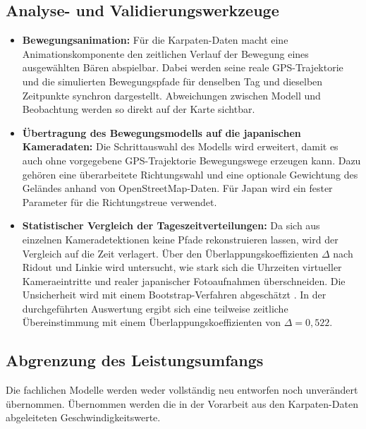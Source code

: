 \documentclass[12pt,a4paper]{report}
\begin{document}
\subsection*{Analyse- und Validierungswerkzeuge}

\begin{itemize}
    
    
    \item \textbf{Bewegungsanimation:}
    Für die Karpaten-Daten macht eine Animationskomponente
    den zeitlichen Verlauf der Bewegung eines ausgewählten
    Bären abspielbar. Dabei werden seine reale
    GPS-Trajektorie und die simulierten Bewegungspfade
    für denselben Tag und dieselben Zeitpunkte synchron
    dargestellt. Abweichungen zwischen Modell und
    Beobachtung werden so direkt auf der Karte sichtbar.
    

    \item \textbf{Übertragung des Bewegungsmodells
    auf die japanischen Kameradaten:}
    Die Schrittauswahl des Modells wird erweitert,
    damit es auch ohne vorgegebene GPS-Trajektorie
    Bewegungswege erzeugen kann. Dazu gehören eine
    überarbeitete Richtungswahl und eine optionale
    Gewichtung des Geländes anhand von OpenStreetMap-Daten.
    Für Japan wird ein fester Parameter für die
    Richtungstreue verwendet.
    
   
    \item \textbf{Statistischer Vergleich der
    Tageszeitverteilungen:}
    Da sich aus einzelnen Kameradetektionen keine
    Pfade rekonstruieren lassen, wird der Vergleich
    auf die Zeit verlagert. Über den
    Überlappungskoeffizienten $\Delta$ nach Ridout
    und Linkie \cite{RidoutLinkie2009} wird
    untersucht, wie stark sich die Uhrzeiten
    virtueller Kameraeintritte und realer
    japanischer Fotoaufnahmen überschneiden.
    Die Unsicherheit wird mit einem
    Bootstrap-Verfahren abgeschätzt \cite{Efron1979}.
    In der durchgeführten Auswertung ergibt sich
    eine teilweise zeitliche Übereinstimmung mit
    einem Überlappungskoeffizienten von
    $\Delta = 0{,}522$.
    
\end{itemize}

\subsection*{Abgrenzung des Leistungsumfangs}

Die fachlichen Modelle werden weder vollständig
neu entworfen noch unverändert übernommen.
Übernommen werden die in der Vorarbeit
\cite{BreuBA} aus den Karpaten-Daten
abgeleiteten Geschwindigkeitswerte.
\end{document}
